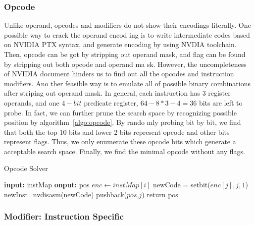 \subsubsection{Opcode}
Unlike operand, opcodes and modifiers do not show their encodings literally. One possible way to crack the operand encod
ing is to write intermediate codes
based on NVIDIA PTX syntax, and generate encoding by using NVDIA toolchain.
Then, opcode can be got by stripping out operand mask, and flag can be found by stripping out both opcode and operand ma
sk. However, the uncompleteness of NVIDIA document hinders us to find out all the opcodes and instruction modifiers. Ano
ther feasible way is to emulate all of possible binary combinations after striping out operand mask.
In general, each instruction has $3$ register operands, and one $4-bit$ predicate register, $64-8*3-4=36$ bits are left 
to probe.
In fact, we can further prune the search space by recognizing possible position by algorithm~\ref{algo:opcode}. By rando
mly probing bit by bit, we find that both the top $10$ bits and lower $2$ bits represent opcode and other bits represent
 flags. Thus, we only enumerate these opcode bits which generate a acceptable search space. Finally, we find the minimal
 opcode without any flags. 


\begin{algorithm}
      \caption{Opcode Solver}\label{algo:opcode}
  \begin{algorithmic}[1]
      \State \textbf {input:} instMap
      \State \textbf {onput:} pos
      \State $enc \gets instMap[i]$ 
      \State newCode = setbit($enc[j], j, 1$)
      \State newInst=nvdisasm(newCode)
      \State pushback($pos$,$j$)
      \EndIf
      \EndIf
      \EndFor
      \EndFor
      \State return pos
  \end{algorithmic}
\end{algorithm}

\subsubsection{Modifier: Instruction Specific}


